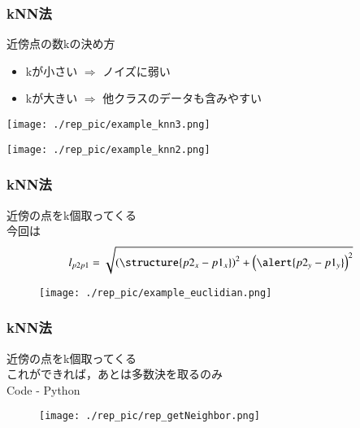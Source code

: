\documentclass[dvipdfmx]{beamer}
\begin{document}
\begin{frame}
  \frametitle{kNN法}
  近傍点の数kの決め方
  \begin{itemize}
    \item kが小さい $ \Rightarrow $ ノイズに弱い
    \item kが大きい $ \Rightarrow $ 他クラスのデータも含みやすい
  \end{itemize}
  \begin{center}
    \begin{minipage}{0.45\columnwidth}
      \centering
      \texttt{[image: ./rep\_pic/example\_knn3.png]}
    \end{minipage}
    \begin{minipage}{0.45\columnwidth}
      \centering
      \texttt{[image: ./rep\_pic/example\_knn2.png]}
    \end{minipage}
  \end{center}
\end{frame}

\begin{frame}
  \frametitle{kNN法}
  近傍の点をk個取ってくる \\
  今回は
  \begin{equation}
    l_{p2p1} = \sqrt{\left( \structure{p2_{x} - p1_{x}} \right)^{2} + \left( \alert{p2_{y} - p1_{y}} \right)^{2}}
  \end{equation}
  \begin{figure}
    \texttt{[image: ./rep\_pic/example\_euclidian.png]}
  \end{figure}
\end{frame}

\begin{frame}
  \frametitle{kNN法}
  近傍の点をk個取ってくる \\
  これができれば，あとは多数決を取るのみ \\
  Code - Python
  \begin{figure}
    \texttt{[image: ./rep\_pic/rep\_getNeighbor.png]}
  \end{figure}
\end{frame}
\end{document}
